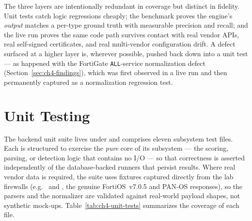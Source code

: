 \documentclass[12pt,a4paper]{report}
\renewcommand{\_}{\textunderscore\allowbreak}
\begin{document}
The three layers are intentionally redundant in coverage but distinct in fidelity. Unit tests catch logic regressions cheaply; the benchmark proves the engine's \emph{output} matches a per-type ground truth with measurable precision and recall; and the live run proves the same code path survives contact with real vendor APIs, real self-signed certificates, and real multi-vendor configuration drift. A defect surfaced at a higher layer is, wherever possible, pushed back down into a unit test --- as happened with the FortiGate \texttt{ALL}-service normalization defect (Section~\ref{sec:ch4-findings}), which was first observed in a live run and then permanently captured as a normalization regression test.

\section{Unit Testing}
\label{sec:ch4-unit-testing}

The backend unit suite lives under  and comprises eleven subsystem test files. Each is structured to exercise the \emph{pure} core of its subsystem --- the scoring, parsing, or detection logic that contains no I/O --- so that correctness is asserted independently of the database-backed runners that persist results. Where real vendor data is required, the suite uses fixtures captured directly from the lab firewalls (e.g.\  and , the genuine FortiOS~v7.0.5 and PAN-OS responses), so the parsers and the normalizer are validated against real-world payload shapes, not synthetic mock-ups. Table~\ref{tab:ch4-unit-tests} summarizes the coverage of each file.
\end{document}
